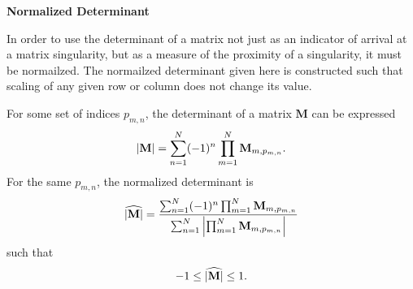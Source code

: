 \documentclass[12pt]{article}
\newcommand{\tit}[1]{\begin{center}\textbf{\Huge{#1}}\end{center}\vspace{1ex}}
\begin{document}
\newpage
\tit{Normalized Determinant}

In order to use the determinant of a matrix not just as an indicator
 of arrival at a matrix singularity,
 but as a measure of the proximity of a singularity,
 it must be normailzed.
The normailzed determinant given here is constructed such that
 scaling of any given row or column does not change its value.

For some set of indices $p_{m,n}$,
 the determinant of a matrix $\mathbf{M}$ can be expressed
\begin{equation}
\left| \mathbf{M} \right| = \sum_{n = 1}^N (-1)^n
 \prod_{m = 1}^N \mathbf{M}_{m,p_{m, n}}.
\end{equation}
For the same $p_{m,n}$, the normalized determinant is
\begin{equation}
\widehat{\left| \mathbf{M} \right|} = \frac
{\sum_{n = 1}^N (-1)^n \prod_{m = 1}^N \mathbf{M}_{m,p_{m, n}}}
{\sum_{n = 1}^N \left| \prod_{m = 1}^N \mathbf{M}_{m,p_{m, n}} \right|}
\end{equation}
 such that
\begin{equation}
-1 \le {\widehat{\left| \mathbf{M} \right|}} \le 1.
\end{equation}
\end{document}
